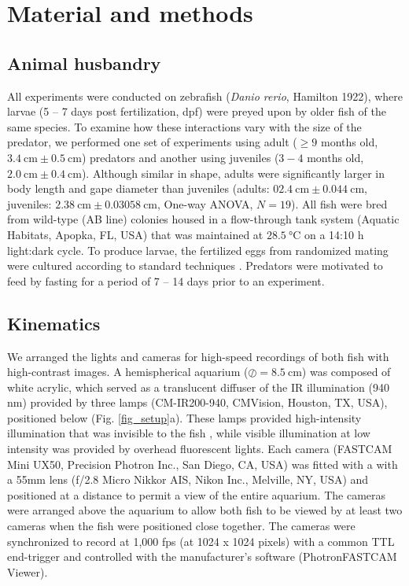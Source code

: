 \documentclass[]{rsos}%
\begin{document}
\section{Material and methods}

\subsection{Animal husbandry}
All experiments were conducted on zebrafish (\textit{Danio rerio}, Hamilton 1922), where larvae (5 -- 7 days post fertilization, dpf) were preyed upon by older fish of the same species. 
To examine how these interactions vary with the size of the predator, we performed one set of experiments using adult ($\geq 9$ months old, $\SI{3.4}{\cm} \pm \SI{0.5}{\cm}$) predators and another using juveniles ($3-4$ months old, $\SI{2.0}{\cm}  \pm  \SI{0.4}{\cm}$). 
Although similar in shape, adults were significantly larger in body length and gape diameter than juveniles (adults: $\SI{02.4}{\cm} \pm \SI{0.044}{\cm}$, juveniles: $\SI{2.38}{\cm} \pm \SI{0.03058}{\cm}$, One-way ANOVA, $N = 19$).
All fish were bred from wild-type (AB line) colonies housed in a flow-through tank system (Aquatic Habitats, Apopka, FL, USA) that was maintained at $\SI{28.5}{\celsius}$ on a 14:10 h light:dark cycle. 
To produce larvae, the fertilized eggs from randomized mating were cultured according to standard techniques \cite{Westerfield:UXiBrEuA}.
Predators were motivated to feed by fasting for a period of 7 -- 14 days prior to an experiment.


\subsection{Kinematics}
We arranged the lights and cameras for high-speed recordings of both fish with high-contrast images. 
A hemispherical aquarium ($\oslash = \SI{8.5}{\cm}$) was composed of white acrylic, which served as a translucent diffuser of the IR illumination (940 nm) provided by three lamps (CM-IR200-940, CMVision, Houston, TX, USA), positioned below (Fig. \ref{fig_setup}a). 
These lamps provided high-intensity illumination that was invisible to the fish \cite{Robinson:1993tu}, while visible illumination at low intensity was provided by overhead fluorescent lights.
Each camera (FASTCAM Mini UX50, Precision Photron Inc., San Diego, CA, USA) was fitted with a with a 55mm lens (f/2.8 Micro Nikkor AIS, Nikon Inc., Melville, NY, USA) and positioned at a distance to permit a view of the entire aquarium. 
The cameras were arranged above the aquarium to allow both fish to be viewed by at least two cameras when the fish were positioned close together.
The cameras were synchronized to record at 1,000 fps (at 1024 x 1024 pixels) with a common TTL end-trigger and controlled with the manufacturer's software (PhotronFASTCAM Viewer).
\end{document}
